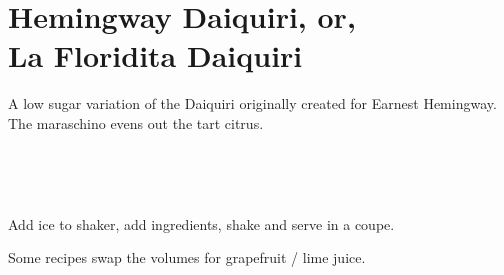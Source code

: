 \section[Hemingway Daiquiri]{
    Hemingway Daiquiri, or,\\ La Floridita Daiquiri
}

\begin{recipestats}[
        servings=1,
        preptime=5 \minute,
        source=Mike \& Jane,
        original=\citefield{howToDrinkHemingway2017}{shorttitle}
        \cite{howToDrinkHemingway2017},
    ]
\end{recipestats}

\begin{recipeabstract}
    A low sugar variation of the Daiquiri originally created for Earnest Hemingway.
    The maraschino evens out the tart citrus.
\end{recipeabstract}

\begin{ingredientcolumns}[1]
    \begin{ingredientblock}
        \\
    \end{ingredientblock}
    \begin{ingredientblock}
        \\
    \end{ingredientblock}
\end{ingredientcolumns}

\begin{preparation}
\item Add ice to shaker, add ingredients, shake and serve in a coupe.
\end{preparation}

\begin{variation}
\item Some recipes swap the volumes for grapefruit / lime juice.
\end{variation}

\recipeend
